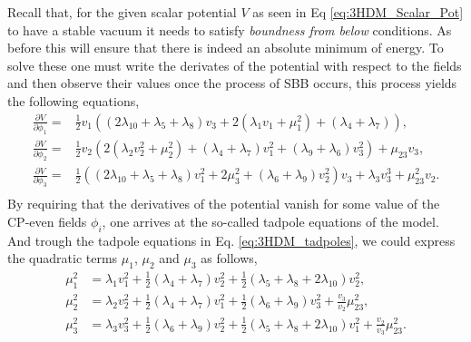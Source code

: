 Recall that, for the given scalar potential $V$ as seen in Eq \ref{eq:3HDM_Scalar_Pot} to have a stable vacuum it needs to satisfy \textit{boundness from below} conditions. 
%
As before\Joaoadd{,} this will ensure that there is indeed an absolute minimum of energy. 
%
To solve these one must write the derivates of the potential with respect to the fields and then observe their values once the process of SBB occurs, this process yields the following equations,
%
\begin{equation}
\label{eq:3HDM_tadpoles}
\begin{split}
\frac{\partial V}{\partial \phi_1} = & \frac{1}{2} v_1 \left( \left( 2 \lambda_{10} + \lambda_5 + \lambda_8 \right) v_3 + 2 \left( \lambda_1 v_1 + \mu_1^2 \right) + \left( \lambda_4 + \lambda_7 \right)  \right),  \\ 
\frac{\partial V}{\partial \phi_2} = & \frac{1}{2} v_2 \left( 2\left( \lambda_2 v_2^2 + \mu_2^2 \right) + \left( \lambda_4 + \lambda_7 \right) v_1^2 + \left( \lambda_9 + \lambda_6 \right)v_3^2 \right) + \mu_{23} v_3, \\
\frac{\partial V}{\partial \phi_3} = & \frac{1}{2} \left( \left( 2 \lambda_{10} + \lambda_5 + \lambda_8  \right) v_1^2  + 2 \mu_3^2 + \left( \lambda_6 + \lambda_9 \right) v_2^2 \right) v_3 + \lambda_3 v_3^3 + \mu_{23}^2 v_2. \\
\end{split} 
\end{equation}
%
By requiring that the derivatives of the potential vanish for some value of the CP-even fields $\phi_i$, one arrives at the so-called tadpole equations of the model.
%
And trough the tadpole equations in Eq. \ref{eq:3HDM_tadpoles}, we could express the quadratic terms $\mu_1$, $\mu_2$ and $\mu_3$ as follows, 
%
\begin{equation}
\label{eq:3HDM_Param_1}
\begin{split}
\mu_1^2 & = \lambda_1 v_1^2 + \frac{1}{2} \left( \lambda_4 + \lambda_7 \right) v^2_2 + \frac{1}{2} \left( \lambda_5 + \lambda_8 + 2 \lambda_{10} \right) v_2^2,  \\ 
\mu_2^2 & = \lambda_2 v_2^2 + \frac{1}{2} \left( \lambda_4 + \lambda_7 \right) v_1^2 + \frac{1}{2} \left( \lambda_6 + \lambda_9 \right) v_3^2 +\frac{v_3}{v_2} \mu^2_{23},  \\
\mu_3^2 & = \lambda_3 v^2_3  + \frac{1}{2}\left( \lambda_6 + \lambda_9 \right) v^2_2 + \frac{1}{2} \left( \lambda_5 + \lambda_8 + 2 \lambda_{10} \right)v_1^2 + \frac{v_2}{v_3} \mu_{23}^2.
\end{split}  
\end{equation}

